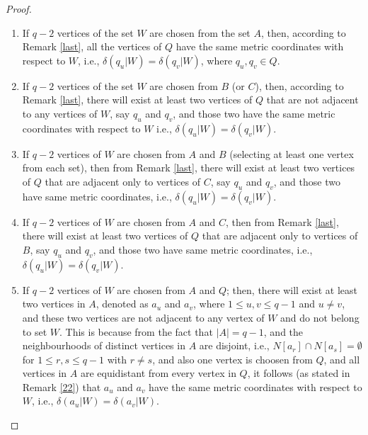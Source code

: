 \documentclass[]{interact}
\theoremstyle{plain}%
\theoremstyle{definition}
\theoremstyle{remark}
\begin{document}
\begin{proof}
\begin{enumerate}
\item If $q-2$ vertices of the set $W$ are chosen from the set $A$, then, according to Remark \ref{last}, all the vertices of $Q$ have the same metric coordinates with respect to $W$, i.e., $\delta(q_{u}|W) =\delta(q_{v}|W)$, where $q_{u},q_{v} \in Q.$
\item If $q-2$ vertices of the set $W$ are chosen from $B$ (or $C$), then, according to Remark \ref{last}, there will exist at least two vertices of $Q$ that are not adjacent to any vertices of $W$, say $q_{u}$ and $q_{v}$, and those two have the same metric coordinates with respect to $W$ i.e., $\delta(q_{u}|W) =\delta(q_{v}|W)$.
\item If $q-2$ vertices of $W$ are chosen from  $A$ and $B$ (selecting at least one vertex from each set), then
from Remark \ref{last}, there will exist at least two vertices of $Q$ that are adjacent only to vertices of $C$, say $q_{u}$ and $q_{v}$, and those two have same metric coordinates, i.e., $\delta(q_{u}|W) =\delta(q_{v}|W)$.
\item If $q-2$ vertices of $W$ are chosen from $A$ and $C$, then
from Remark \ref{last}, there will exist at least two vertices of $Q$ that are adjacent only to vertices of $B$, say $q_{u}$ and $q_{v}$, and those two have same metric coordinates, i.e., $\delta(q_{u}|W) =\delta(q_{v}|W)$.
\item  \label{item1} If $q-2$ vertices of $W$ are chosen from \( A \) and \( Q \); then, there will exist at least two vertices in \( A \), denoted as \( a_u \) and \( a_v \), where \( 1 \leq u, v\leq q-1\) and \(u\neq v \), and these two vertices are not adjacent to any vertex of  \( W \) and do not belong to set \( W \). This is because from the fact that \( |A| = q-1 \), and the neighbourhoods of distinct vertices in \( A \) are disjoint, i.e., \( N[a_r] \cap N[a_s] = \emptyset \) for \( 1 \leq r, s \leq q-1 \) with \( r \neq s \), and also one vertex is choosen from \( Q \), and all vertices in \( A \) are equidistant from every vertex in \( Q \), it follows (as stated in Remark \ref{22}) that  \( a_u \) and \( a_v \) have the same metric coordinates with respect to \( W \), i.e., $\delta(a_u | W) = \delta(a_v | W)$.

\end{enumerate}
\end{proof}
\end{document}
